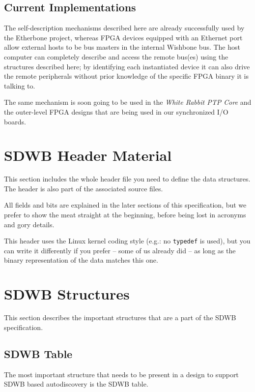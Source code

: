 \documentclass[a4paper, 12pt]{article}
\begin{document}
\subsection{Current Implementations}

The self-description mechanisms described here are already
successfully used by the Etherbone project, whereas FPGA devices
equipped with an Ethernet port allow external hosts to be bus masters
in the internal Wishbone bus.  The host computer can completely
describe and access the remote bus(es) using the structures described
here; by identifying each instantiated device it can also drive the
remote peripherals without prior knowledge of the specific FPGA binary
it is talking to.

The same mechanism is soon going to be used in the \textit{White
Rabbit PTP Core} and the outer-level FPGA designs that are
being used in our synchronized I/O boards.

\section{SDWB Header Material}

This section includes the whole header file you need to define
the data structures. The header is also part of the associated source files.

All fields and bits are explained in the later sections of this
specification, but we prefer to show the meat straight at the
beginning, before being lost in acronyms and gory details.

This header uses the Linux kernel coding style (e.g.: no \texttt{typedef} is used),
but you can write it differently if you prefer -- some of us already did -- as
long as the binary representation of the data matches this one.


\section{SDWB Structures}

This section describes the important structures that are a part of the SDWB specification.

\subsection{SDWB Table}

The most important structure that needs to be present in a design to support SDWB
based autodiscovery is the SDWB table.
\end{document}
